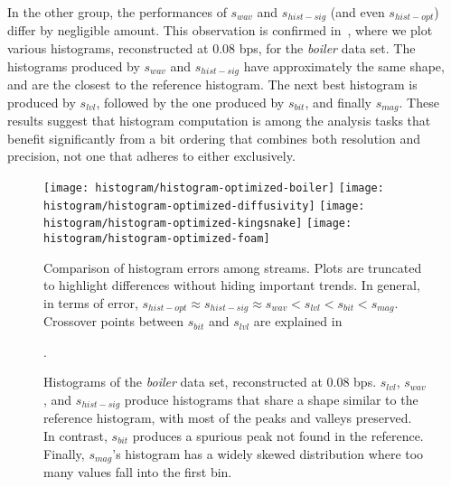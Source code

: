In the other group, the performances of $s_{wav}$ and $s_{hist-sig}$ (and even $s_{hist-opt}$)
differ by negligible amount. This observation is confirmed in~, where we
plot various histograms, reconstructed at 0.08 bps, for the \emph{boiler} data set. The histograms
produced by $s_{wav}$ and $s_{hist-sig}$ have approximately the same shape, and are the closest to
the reference histogram. The next best histogram is produced by $s_{lvl}$, followed by the one
produced by $s_{bit}$, and finally $s_{mag}$. These results suggest that histogram computation is
among the analysis tasks that benefit significantly from a bit ordering that combines both
resolution and precision, not one that adheres to either exclusively.

\begin{figure*}[h]
	\centering
	{\texttt{[image: histogram/histogram-optimized-boiler]}}
	{\texttt{[image: histogram/histogram-optimized-diffusivity]}}
	{\texttt{[image: histogram/histogram-optimized-kingsnake]}}
	{\texttt{[image: histogram/histogram-optimized-foam]}}
	\caption{Comparison of histogram errors among streams. Plots are truncated to highlight
	differences without hiding important trends. In general, in terms of error, $s_{hist-opt}\approx
	s_{hist-sig}\approx s_{wav} < s_{lvl} < s_{bit} < s_{mag}$. Crossover points between $s_{bit}$ and
	$s_{lvl}$ are explained in~}.
	\label{fig:histogram-stream-comparison}
\vspace{1em}

	\centering
	\caption{Histograms of the \emph{boiler} data set, reconstructed at 0.08 bps. $s_{lvl}$,
	$s_{wav}$, and $s_{hist-sig}$ produce histograms that share a shape similar to the reference
	histogram, with most of the peaks and valleys preserved. In contrast, $s_{bit}$ produces a
	spurious peak not found in the reference. Finally, $s_{mag}$'s histogram has a widely skewed
	distribution where too many values fall into the first bin.}
	\label{fig:histograms-boiler}
\end{figure*}

